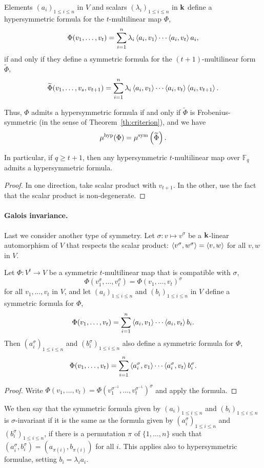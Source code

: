 \documentclass[11pt]{article}
\begin{document}
\begin{lm}
\label{lm:hyp=symtilde}
Elements $(a_i)_{1\leq i\leq n}$ in $V$ and scalars $(\lambda_i)_{1\leq i\leq n}$ in $\mathbf{k}$ define a hypersymmetric formula for the $t$-multilinear map $\Phi$,
\[
\Phi(v_1,\dots,v_t)=\sum_{i=1}^{n}\lambda_i\left\langle a_i,v_1\right\rangle\cdots\left\langle a_i,v_t\right\rangle a_i,
\]
if and only if they define a symmetric formula for the $(t+1)$-multilinear form $\widetilde{\Phi}$,
\[
\widetilde{\Phi}(v_1,\dots,v_s,v_{t+1})=\sum_{i=1}^{n}\lambda_i\left\langle a_i,v_1\right\rangle\cdots\left\langle a_i,v_t\right\rangle\left\langle a_i,v_{t+1}\right\rangle.
\]

Thus, $\Phi$ admits a hypersymmetric formula if and only if $\widetilde{\Phi}$ is Frobenius-symmetric (in the sense of Theorem~\ref{th:criterion}),
and we have
\[
\mu^{\textrm{hyp}}(\Phi)=\mu^{\textrm{sym}}\left(\widetilde{\Phi}\right).
\]

In particular, if $q\geq t+1$, then any hypersymmetric $t$-multilinear map over $\mathbb{F}_q$ admits a hypersymmetric formula.
\end{lm}
\begin{proof}
In one direction, take scalar product with $v_{t+1}$. In the other, use the fact that the scalar product is non-degenerate.
\end{proof}

\paragraph{Galois invariance.}
Last we consider another type of symmetry.
Let $\sigma:v\mapsto v^\sigma$ be a $\mathbf{k}$-linear automorphism of $V$
that respects the scalar product: $\left\langle v^\sigma,w^\sigma\right\rangle=\left\langle v,w\right\rangle$ for all $v,w$ in $V$.
\begin{lm}
\label{lm:symGalois}
Let $\Phi:V^t\to V$ be a symmetric $t$-multilinear map that is compatible with $\sigma$, \ie
\[
\Phi(v_1^\sigma,\dots,v_t^\sigma)=\Phi(v_1,\dots,v_t)^\sigma
\]
for all $v_1,\dots,v_t$ in $V$,
and let $(a_i)_{1\leq i\leq n}$ and $(b_i)_{1\leq i\leq n}$ in $V$ define a symmetric formula for $\Phi$,
\[
\Phi(v_1,\dots,v_t)=\sum_{i=1}^{n}\left\langle a_i,v_1\right\rangle\cdots\left\langle a_i,v_t\right\rangle b_i.
\]
Then $(a_i^\sigma)_{1\leq i\leq n}$ and $(b_i^\sigma)_{1\leq i\leq n}$ also define a symmetric formula for $\Phi$,
\[
\Phi(v_1,\dots,v_t)=\sum_{i=1}^{n}\left\langle a_i^\sigma,v_1\right\rangle\cdots\left\langle a_i^\sigma,v_t\right\rangle b_i^\sigma.
\]
\end{lm}
\begin{proof}
Write $\Phi(v_1,\dots,v_t)=\Phi(v_1^{\sigma^{-1}},\dots,v_t^{\sigma^{-1}})^\sigma$ and apply the formula.
\end{proof}
We then say that the symmetric formula given by $(a_i)_{1\leq i\leq n}$ and $(b_i)_{1\leq i\leq n}$ is $\sigma$-invariant if it is the same as the formula given by $(a_i^\sigma)_{1\leq i\leq n}$ and $(b_i^\sigma)_{1\leq i\leq n}$,
\ie if there is a permutation $\pi$ of $\{1,\dots,n\}$ such that $(a_i^\sigma,b_i^\sigma)=(a_{\pi(i)},b_{\pi(i)})$ for all $i$. This applies also to hypersymmetric formulae, setting $b_i=\lambda_i a_i$.
\end{document}
